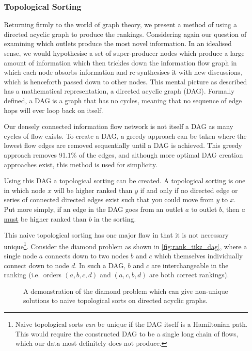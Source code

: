 \subsubsection{Topological Sorting}

Returning firmly to the world of graph theory, we present a method of using a directed acyclic graph to produce the rankings. Considering again our question of examining which outlets produce the most novel information. In an idealised sense, we would hypothesise a set of super-producer nodes which produce a large amount of information which then trickles down the information flow graph in which each node absorbs information and re-synthesises it with new discussions, which is henceforth passed down to other nodes. This mental picture as described has a mathematical representation, a directed acyclic graph (DAG). Formally defined, a DAG is a graph that has no cycles, meaning that no sequence of edge hops will ever loop back on itself.

Our densely connected information flow network is not itself a DAG as many cycles of flow exists. To create a DAG, a greedy approach can be taken where the lowest flow edges are removed sequentially until a DAG is achieved. This greedy approach removes 91.1\% of the edges, and although more optimal DAG creation approaches exist, this method is used for simplicity. 

Using this DAG a topological sorting can be created. A topological sorting is one in which node $x$ will be higher ranked than $y$ if and only if no directed edge or series of connected directed edges exist such that you could move from $y$ to $x$. Put more simply, if an edge in the DAG goes from an outlet $a$ to outlet $b$, then $a$ \underline{must} be higher ranked than $b$ in the sorting.

This naive topological sorting has one major flaw in that it is not necessary unique\footnote{Naive topological sorts \emph{can} be unique if the DAG itself is a Hamiltonian path. This would require the constructed DAG to be a single long chain of flows, which our data most definitely does not produce.}. Consider the diamond problem as shown in \autoref{fig:rank_tikz_dag}, where a single node $a$ connects down to two nodes $b$ and $c$ which themselves individually connect down to node $d$. In such a DAG, $b$ and $c$ are interchangeable in the ranking (i.e.\ orders $(a,b,c,d)$ and $(a,c,b,d)$ are both correct rankings).

\begin{figure}[!htbp]
\centering
{}
\caption{A demonstration of the diamond problem which can give non-unique solutions to naive topological sorts on directed acyclic graphs.}\label{fig:rank_tikz_dag}
\end{figure}

